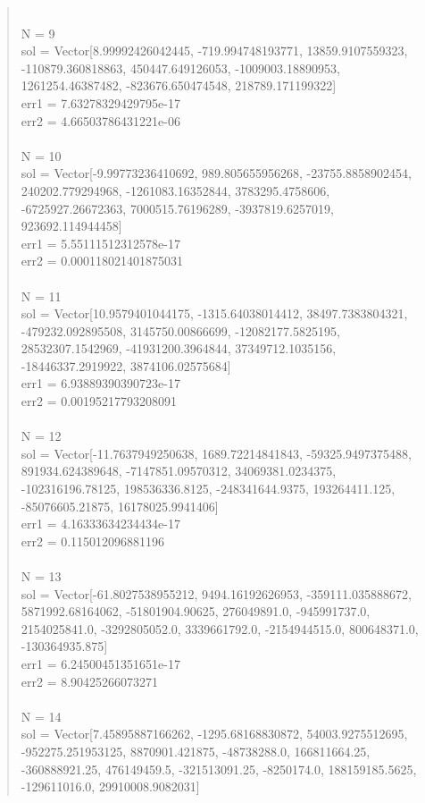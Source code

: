\documentclass[letterpaper,12pt]{article}
\begin{document}
\begin{quote}
\\N = 9
\\sol = Vector[8.99992426042445, -719.994748193771, 13859.9107559323, -110879.360818863, 450447.649126053, -1009003.18890953, 1261254.46387482, -823676.650474548, 218789.171199322]
\\err1 = 7.63278329429795e-17
\\err2 = 4.66503786431221e-06
\\
\\N = 10
\\sol = Vector[-9.99773236410692, 989.805655956268, -23755.8858902454, 240202.779294968, -1261083.16352844, 3783295.4758606, -6725927.26672363, 7000515.76196289, -3937819.6257019, 923692.114944458]
\\err1 = 5.55111512312578e-17
\\err2 = 0.000118021401875031
\\
\\N = 11
\\sol = Vector[10.9579401044175, -1315.64038014412, 38497.7383804321, -479232.092895508, 3145750.00866699, -12082177.5825195, 28532307.1542969, -41931200.3964844, 37349712.1035156, -18446337.2919922, 3874106.02575684]
\\err1 = 6.93889390390723e-17
\\err2 = 0.00195217793208091
\\
\\N = 12
\\sol = Vector[-11.7637949250638, 1689.72214841843, -59325.9497375488, 891934.624389648, -7147851.09570312, 34069381.0234375, -102316196.78125, 198536336.8125, -248341644.9375, 193264411.125, -85076605.21875, 16178025.9941406]
\\err1 = 4.16333634234434e-17
\\err2 = 0.115012096881196
\\
\\N = 13
\\sol = Vector[-61.8027538955212, 9494.16192626953, -359111.035888672, 5871992.68164062, -51801904.90625, 276049891.0, -945991737.0, 2154025841.0, -3292805052.0, 3339661792.0, -2154944515.0, 800648371.0, -130364935.875]
\\err1 = 6.24500451351651e-17
\\err2 = 8.90425266073271
\\
\\N = 14
\\sol = Vector[7.45895887166262, -1295.68168830872, 54003.9275512695, -952275.251953125, 8870901.421875, -48738288.0, 166811664.25, -360888921.25, 476149459.5, -321513091.25, -8250174.0, 188159185.5625, -129611016.0, 29910008.9082031]

\end{quote}
\end{document}

